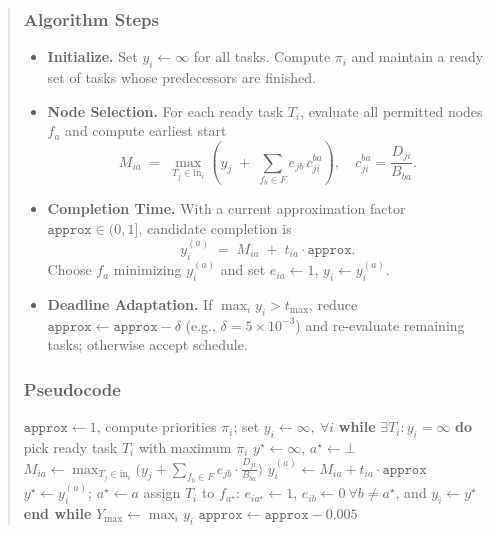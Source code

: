 \documentclass[conference]{IEEEtran}
\begin{document}
\begin{abstract}
\subsubsection{Algorithm Steps}
\begin{itemize}
    \item \textbf{Initialize.} Set \(y_i\gets\infty\) for all tasks. Compute \(\pi_i\) and maintain a ready set of tasks whose predecessors are finished.
    \item \textbf{Node Selection.} For each ready task \(T_i\), evaluate all permitted nodes \(f_a\) and compute earliest start
    \[
    M_{ia} \;=\; \max_{T_j\in \text{in}_i}\!\left( y_j \;+\; \sum_{f_b\in F} e_{jb}\,c_{ji}^{ba}\right),
    \quad c_{ji}^{ba}=\frac{D_{ji}}{B_{ba}}.
    \]
    \item \textbf{Completion Time.} With a current approximation factor \(\texttt{approx}\in(0,1]\), candidate completion is
    \[
    y_i^{(a)} \;=\; M_{ia} \;+\; t_{ia}\cdot \texttt{approx}.
    \]
    Choose \(f_a\) minimizing \(y_i^{(a)}\) and set \(e_{ia}\gets 1\), \(y_i\gets y_i^{(a)}\).
    \item \textbf{Deadline Adaptation.} If \(\max_i y_i > t_{\max}\), reduce \(\texttt{approx}\leftarrow \texttt{approx}-\delta\) (e.g., \(\delta=5\!\times\!10^{-3}\)) and re-evaluate remaining tasks; otherwise accept schedule.
\end{itemize}

\subsubsection{Pseudocode}
\begin{algorithm}[t]
\caption{Bandwidth/Data-Aware Greedy DAG Scheduler}
\label{alg:greedy_scheduler}
\begin{algorithmic}[1]
\STATE $\texttt{approx}\leftarrow 1$, compute priorities $\pi_i$; set $y_i\leftarrow\infty,\ \forall i$
\REPEAT
  \STATE \textbf{while} $\exists T_i: y_i=\infty$ \textbf{do}
    \STATE pick ready task $T_i$ with maximum $\pi_i$
    \STATE $y^\star\leftarrow\infty$, $a^\star\leftarrow\bot$
        \STATE $M_{ia}\leftarrow \max_{T_j\in \text{in}_i}\big(y_j+\sum_{f_b\in F} e_{jb}\cdot \tfrac{D_{ji}}{B_{ba}}\big)$
        \STATE $y_i^{(a)}\leftarrow M_{ia}+t_{ia}\cdot \texttt{approx}$
            \STATE $y^\star\leftarrow y_i^{(a)}$; $a^\star\leftarrow a$ 
        \ENDIF
    \ENDFOR
    \STATE assign $T_i$ to $f_{a^\star}$: $e_{ia^\star}\leftarrow 1$, $e_{ib}\leftarrow 0\ \forall b\neq a^\star$, and $y_i\leftarrow y^\star$
  \STATE \textbf{end while}
  \STATE $Y_{\max}\leftarrow \max_i y_i$
   \STATE $\texttt{approx}\leftarrow \texttt{approx}-0.005$ \ENDIF
{}
\end{algorithmic}
\end{algorithm}


\end{abstract}
\end{document}
